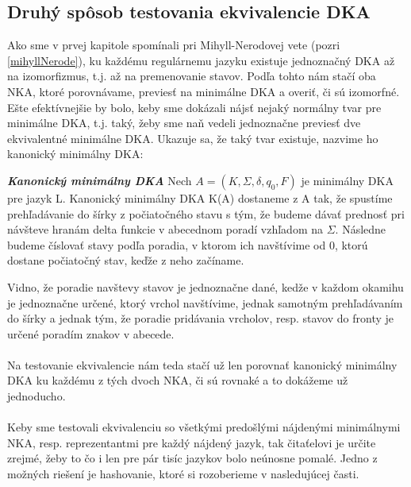\subsection{Druhý spôsob testovania ekvivalencie DKA}
Ako sme v prvej kapitole spomínali pri Mihyll-Nerodovej vete (pozri \ref{mihyllNerode}), ku každému regulárnemu jazyku existuje jednoznačný DKA až na izomorfizmus, t.j. až na premenovanie stavov. Podľa tohto nám stačí oba NKA, ktoré porovnávame, previesť na minimálne DKA a overiť, či sú izomorfné. Ešte efektívnejšie by bolo, keby sme dokázali nájsť nejaký normálny tvar pre minimálne DKA, t.j. taký, žeby sme naň vedeli jednoznačne previesť dve ekvivalentné minimálne DKA. Ukazuje sa, že taký tvar existuje, nazvime ho kanonický minimálny DKA:
\\

\label{kanMinDKA}
\begin{defn}{\textbf {\textit {Kanonický minimálny DKA}}} Nech $A = (K,\Sigma,\delta,q_0,F)$ je minimálny DKA pre jazyk L. Kanonický minimálny DKA K(A) dostaneme z A tak, že spustíme prehľadávanie do šírky z počiatočného stavu s tým, že budeme dávať prednosť pri návšteve hranám delta funkcie v abecednom poradí vzhľadom na $\Sigma$. Následne budeme číslovať stavy podľa poradia, v ktorom ich navštívime od 0, ktorú dostane počiatočný stav, keďže z neho začíname.
\end{defn}
Vidno, že poradie navštevy stavov je jednoznačne dané, kedže v každom okamihu je jednoznačne určené, ktorý vrchol navštívime, jednak samotným prehľadávaním do šírky a jednak tým, že poradie pridávania vrcholov, resp. stavov do fronty je určené poradím znakov v abecede.

\paragraph{}
Na testovanie ekvivalencie nám teda stačí už len porovnať kanonický minimálny DKA ku každému z tých dvoch NKA, či sú rovnaké a to dokážeme už jednoducho.

\paragraph{}
Keby sme testovali ekvivalenciu so všetkými predošlými nájdenými minimálnymi NKA, resp. reprezentantmi pre každý nájdený jazyk, tak čitaťelovi je určite zrejmé, žeby to čo i len pre pár tisíc jazykov bolo neúnosne pomalé. Jedno z možných riešení je hashovanie, ktoré si rozoberieme v nasledujúcej časti.



